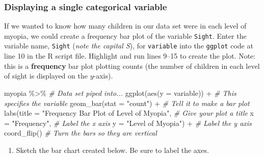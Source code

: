 \documentclass[
]{report}
\newenvironment{Shaded}{\begin{snugshade}}{\end{snugshade}}
\newcommand{\AttributeTok}[1]{\textcolor[rgb]{0.77,0.63,0.00}{#1}}
\newcommand{\CommentTok}[1]{\textcolor[rgb]{0.56,0.35,0.01}{\textit{#1}}}
\newcommand{\FunctionTok}[1]{\textcolor[rgb]{0.00,0.00,0.00}{#1}}
\newcommand{\NormalTok}[1]{#1}
\newcommand{\SpecialCharTok}[1]{\textcolor[rgb]{0.00,0.00,0.00}{#1}}
\newcommand{\StringTok}[1]{\textcolor[rgb]{0.31,0.60,0.02}{#1}}
\providecommand{\tightlist}{%
  \setlength{\itemsep}{0pt}\setlength{\parskip}{0pt}}
\begin{document}
\vspace{0.3in}

\hypertarget{displaying-a-single-categorical-variable}{%
\subsubsection*{Displaying a single categorical variable}\label{displaying-a-single-categorical-variable}}

If we wanted to know how many children in our data set were in each level of myopia, we could create a frequency bar plot of the variable \texttt{Sight}. Enter the variable name, \texttt{Sight} (\emph{note the capital S}), for \texttt{variable} into the \texttt{ggplot} code at line 10 in the R script file. Highlight and run lines 9--15 to create the plot. Note: this is a \textbf{frequency} bar plot plotting counts (the number of children in each level of sight is displayed on the \(y\)-axis).

\begin{Shaded}
\begin{Highlighting}[]
\NormalTok{myopia }\SpecialCharTok{\%\textgreater{}\%} \CommentTok{\# Data set piped into...}
\FunctionTok{ggplot}\NormalTok{(}\FunctionTok{aes}\NormalTok{(}\AttributeTok{y =}\NormalTok{ variable)) }\SpecialCharTok{+}   \CommentTok{\# This specifies the variable}
  \FunctionTok{geom\_bar}\NormalTok{(}\AttributeTok{stat =} \StringTok{"count"}\NormalTok{) }\SpecialCharTok{+}  \CommentTok{\# Tell it to make a bar plot}
  \FunctionTok{labs}\NormalTok{(}\AttributeTok{title =} \StringTok{"Frequency Bar Plot of Level of Myopia"}\NormalTok{,  }\CommentTok{\# Give your plot a title}
       \AttributeTok{x =} \StringTok{"Frequency"}\NormalTok{,   }\CommentTok{\# Label the x axis}
       \AttributeTok{y =} \StringTok{"Level of Myopia"}\NormalTok{)  }\SpecialCharTok{+} \CommentTok{\# Label the y axis}
  \FunctionTok{coord\_flip}\NormalTok{()  }\CommentTok{\# Turn the bars so they are vertical}
\end{Highlighting}
\end{Shaded}

\begin{enumerate}
\def\labelenumi{\arabic{enumi}.}
\setcounter{enumi}{2}
\tightlist
\item
  Sketch the bar chart created below. Be sure to label the axes.
\end{enumerate}

\vspace{2in}
\end{document}
